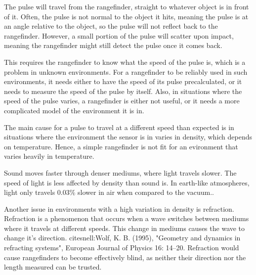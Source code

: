 The pulse will travel from the rangefinder, straight to whatever object is in front of it. Often, the pulse is not normal to the object it hits, meaning the pulse is at an angle relative to the object, so the pulse will not reflect back to the rangefinder. However, a small portion of the pulse will scatter upon impact, meaning the rangefinder might still detect the pulse once it comes back.

This requires the rangefinder to know what the speed of the pulse is, which is a problem in unknown environments. For a rangefinder to be reliably used in such environments, it needs either to have the speed of its pulse precalculated, or it needs to measure the speed of the pulse by itself. Also, in situations where the speed of the pulse varies, a rangefinder is either not useful, or it needs a more complicated model of the environment it is in.

The main cause for a pulse to travel at a different speed than expected is in situations where the environment the sensor is in varies in density, which depends on temperature\cite{refraction}. Hence, a simple rangefinder is not fit for an evironment that varies heavily in temperature.

Sound moves faster through denser mediums, where light travels slower. The speed of light is less affected by density than sound is. In earth-like atmospheres, light only travels 0.03\% slower in air when compared to the vacuum.\cite{refraction}\cite{speedOfSound}.

Another issue in environments with a high variation in density is refraction. Refraction is a phenomenon that occurs when a wave switches between mediums where it travels at different speeds. This change in mediums causes the wave to change it's direction. cite{snell:Wolf, K. B. (1995), "Geometry and dynamics in refracting systems", European Journal of Physics 16: 14–20.} Refraction would cause rangefinders to become effectively blind, as neither their direction nor the length measured can be trusted.

